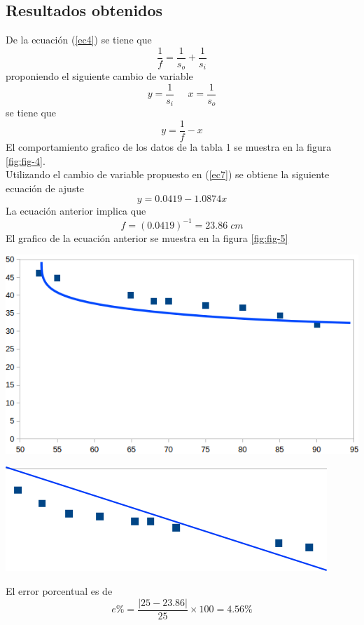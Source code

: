 \documentclass[13,twocolumn,letterpaper]{article}
\newenvironment{Figure}{\par\medskip\noindent\minipage{\linewidth}}{\endminipage\par\medskip}
\begin{document}
\begin{multicols}{2}
	
	\section*{Resultados obtenidos}
	
			De la ecuación (\ref{ec4}) se tiene que 
		$$\dfrac{1}{f}=\dfrac{1}{s_{o}}+\dfrac{1}{s_{i}}$$
		proponiendo el siguiente cambio de variable 
		\begin{equation}\label{ec6}
		y=\dfrac{1}{s_{i}}\;\;\;\;\;x=\dfrac{1}{s_{o}}
		\end{equation}
		se tiene que 
		\begin{equation}\label{ec7}
		y=\dfrac{1}{f}-x
		\end{equation}
		El comportamiento grafico de los datos de la tabla 1 se muestra en la figura \ref{fig:fig-4}.  \\
		Utilizando el cambio de variable propuesto en (\ref{ec7}) se obtiene la siguiente ecuación de ajuste
		\begin{equation}
			y=0.0419-1.0874x
		\end{equation}
		La ecuación anterior implica que 
		$$f=(0.0419)^{-1}=23.86\;cm$$
		El grafico de la ecuación anterior se muestra en la figura \ref{fig:fig-5}
		\begin{Figure}
			\raggedleft
			\includegraphics[width=\linewidth]{fig4}
			\label{fig:fig-4}
		\end{Figure}
	\begin{Figure}
		\raggedleft
		\includegraphics[width=\linewidth]{fig5}
		\label{fig:fig-5}
	\end{Figure}
	El error porcentual es de 
	$$e\%=\dfrac{|25-23.86|}{25}\times 100=4.56 \%$$
	

\end{multicols}
\end{document}
